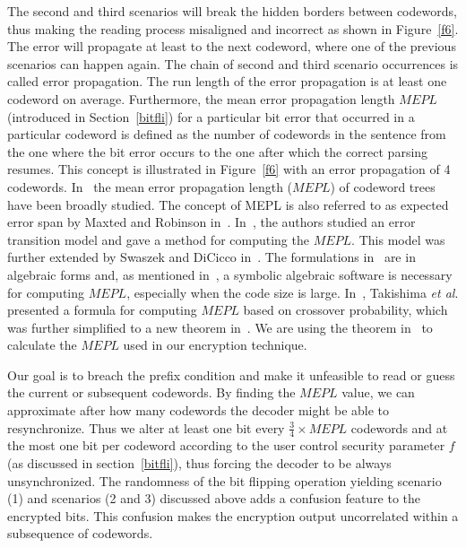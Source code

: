 \documentclass[preprint]{elsarticle}
\begin{document}
The second and third scenarios will break the hidden borders between codewords, thus making the reading process misaligned and incorrect as shown in Figure~\ref{f6}. The error will propagate at least to the next codeword, where one of the previous scenarios can happen again. The chain of second and third scenario occurrences is called error propagation. The run length of the error propagation is at least one codeword on average. Furthermore, the mean error propagation length $MEPL$ (introduced in Section~\ref{bitfli}) for a particular bit error that occurred in a particular codeword is defined as the number of codewords in the sentence from the one where the bit error occurs to the one after which the correct parsing resumes. This concept is illustrated in Figure~\ref{f6} with an error propagation of 4 codewords. In~\cite{Monaco1987, Montgomery1986, NIST, Spanos1995, Swaszek1995} the mean error propagation length ($MEPL$) of codeword trees have been broadly studied. The concept of MEPL is also referred to as expected error span by Maxted and Robinson in~\cite{Maxted1985}. In~\cite{Maxted1985}, the authors studied an error transition model and gave a method for computing the $MEPL$. This model was further extended by Swaszek and DiCicco in~\cite{Swaszek1995}. The formulations in~\cite{Maxted1985, Monaco1987, Swaszek1995} are in algebraic forms and, as mentioned in~\cite{NIST}, a symbolic algebraic software is necessary for computing $MEPL$, especially when the code size is large. In~\cite{Takishima1994}, Takishima \textit{et al}. presented a formula for computing $MEPL$ based on crossover probability, which was further simplified to a new theorem in~\cite{Swaszek1995}. We are using the theorem in~\cite{Zhou2002} to calculate the $MEPL$ used in our encryption technique.

Our goal is to breach the prefix condition and make it unfeasible to read or guess the current or subsequent codewords. By finding the $MEPL$ value, we can approximate after how many codewords the decoder might be able to resynchronize. Thus we alter at least one bit every $\frac{3}{4} \times MEPL$ codewords and at the most one bit per codeword according to the user control security parameter $f$ (as discussed in section~\ref{bitfli}), thus forcing the decoder to be always unsynchronized. The randomness of the bit flipping operation yielding scenario (1) and scenarios (2 and 3) discussed above adds a confusion feature to the encrypted bits. This confusion makes the encryption output uncorrelated within a subsequence of codewords.
\end{document}
